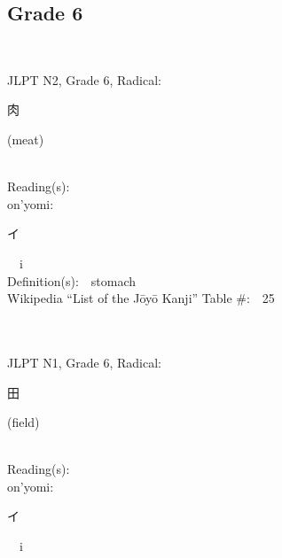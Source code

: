 \newpage



\subsection*{Grade 6 }
  \label{P1-6}
\begin{multicols}{2}
{\fontsize{34pt}{40pt}  }\ \ \\  %
{JLPT N2, Grade 6, Radical:\ \ {\begin{CJK}{UTF8}{min} 肉 \end{CJK}} (meat) } \\
Reading(s):\ \ \\
{\hspace*{1em}}on'yomi:\ \ \\
{\hspace*{2em}}{\begin{CJK}{UTF8}{min} イ \end{CJK}}\ \ i\ \ \\
Definition(s):\ \ stomach \\
Wikipedia ``List of the J\=oy\=o Kanji'' Table \#:\ \ 25 \\
\ \ \\
{\fontsize{34pt}{40pt}  }\ \ \\  %
{JLPT N1, Grade 6, Radical:\ \ {\begin{CJK}{UTF8}{min} 田 \end{CJK}} (field) } \\
Reading(s):\ \ \\
{\hspace*{1em}}on'yomi:\ \ \\
{\hspace*{2em}}{\begin{CJK}{UTF8}{min} イ \end{CJK}}\ \ i\ \ \\

\end{multicols}
